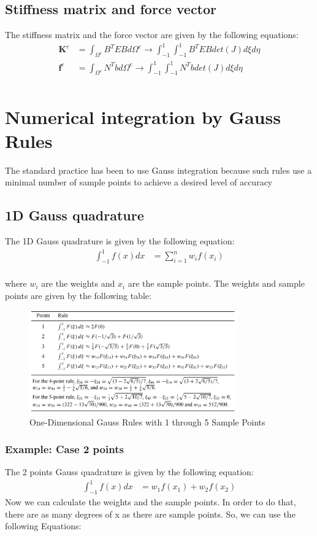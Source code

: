 \documentclass{article}  %
\begin{document}
\subsection{Stiffness matrix and force vector}
The stiffness matrix and the force vector are given by the following equations:
\begin{align}
  \mathbf{K}^e &= \int_{\Omega^e} B^T E B d\Omega^e \rightarrow \int_{-1}^{1}\int_{-1}^{1} B^T E B det(J)d\xi d\eta\\
  \mathbf{f}^e &= \int_{\Omega^e} N^T b d\Omega^e \rightarrow \int_{-1}^{1}\int_{-1}^{1} N^T b det(J)d\xi d\eta\\
\end{align}


\section{Numerical integration by Gauss Rules}
The standard practice has been to use Gauss integration because such rules use a minimal number of sample points to achieve a desired level of accuracy
\subsection{1D Gauss quadrature}
The 1D Gauss quadrature is given by the following equation:
\begin{align}
  \int_{-1}^{1} f(x) dx & = \sum_{i=1}^{n} w_i f(x_i) \\
\end{align}

where $w_i$ are the weights and $x_i$ are the sample points. The weights and sample points are given by the following table:
\begin{figure}[h]
    \centering
    \includegraphics[width=0.8\textwidth]{Graphics/gauss_points.PNG}
    \caption{One-Dimensional Gauss Rules with 1 through 5 Sample Points}
    \label{fig:gauss_1d}
\end{figure}

\subsubsection{Example: Case 2 points}
The 2 points Gauss quadrature is given by the following equation:
\begin{align}
  \int_{-1}^{1} f(x) dx & = w_1 f(x_1) + w_2 f(x_2) 
\end{align}
Now we can calculate the weights and the sample points. In order to do that, there are as many degrees of x as there are sample points. So, we can use the following Equations:
\end{document}
